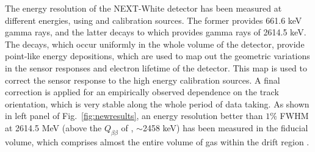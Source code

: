 The energy resolution of the NEXT-White detector has been measured at different energies, using  and  calibration sources. The former provides 661.6 keV gamma rays, and the latter decays to  which provides gamma rays of 2614.5 keV. The  decays, which occur uniformly in the whole volume of the detector, provide point-like energy depositions, which are used to map out the geometric variations in the sensor responses and electron lifetime of the detector. This map is used to correct the sensor response to the high energy calibration sources. A final correction is applied for an empirically observed dependence on the track orientation, which is very stable along the whole period of data taking. As shown in left panel of Fig.~\ref{fig:newresults}, an energy resolution better than $1\%$ FWHM at 2614.5 MeV (above the $Q_{\beta\beta}$ of , $\sim$2458 keV) has been measured in the fiducial volume, which comprises almost the entire volume of gas within the drift region \cite{Renner:2019pfe}.


